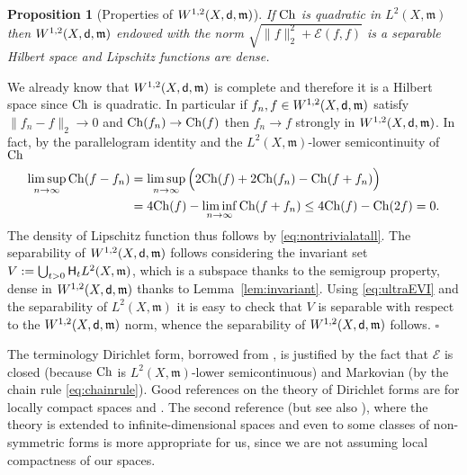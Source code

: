 \documentclass[reqno,11pt]{article}
\numberwithin{equation}{section}
\newcommand{\C}{\mathbb{C}}
\newcommand{\mm}{{\mbox{\boldmath$m$}}}
\newcommand{\sfd}{{\sf d}}
\newenvironment{proof}{\removelastskip\par\medskip   %
\noindent{\em Proof.}
\rm}{\penalty-20\null\hfill$\square$\par\medbreak}
\newtheorem{proposition}[theorem]{Proposition}
\renewcommand{\C}{{\rm Ch}}
\newcommand{\heatl}{{\sf H}}
\renewcommand{\mm}{\mathfrak m}
\begin{document}
\begin{proposition}[Properties of $W^{1,2}(X,\sfd,\mm)$]\label{prop:lipdense}
If $\C$ is quadratic in $L^2(X,\mm)$ then $W^{1,2}(X,\sfd,\mm)$
endowed with the norm $\sqrt{\|f\|_2^2+\mathcal E(f,f)}$ is a
separable Hilbert space and Lipschitz functions are dense.
\end{proposition}
\begin{proof} We already know that $W^{1,2}(X,\sfd,\mm)$ is complete \cite[Remark
4.7]{Ambrosio-Gigli-Savare11} and therefore it is a Hilbert space
since $\C$ is quadratic. In particular if $f_n,f\in
W^{1,2}(X,\sfd,\mm)$ satisfy $\|f_n-f\|_2\to 0$ and
$\C(f_n)\to\C(f)$ then $f_n\to f$ strongly in $W^{1,2}(X,\sfd,\mm)$.
In fact, by the parallelogram identity and the $L^2(X,\mm)$-lower
semicontinuity of $\C$
\begin{align*}
  \limsup_{n\to\infty}\C(f-f_n)&=
  \limsup_{n\to\infty}\Big(2\C(f)+2\C(f_n)-\C(f+f_n)\Big)
  \\&=4\C(f)-\liminf_{n\to\infty} \C(f+f_n)\le 4\C(f)-\C(2f)=0.
\end{align*}
The density of Lipschitz function thus follows by
\eqref{eq:nontrivialatall}. The separability of
$W^{1,2}(X,\sfd,\mm)$ follows considering the invariant set
$V:=\bigcup_{t>0}\heatl_tL^2(X,\mm)$, which is a subspace thanks to
the semigroup property, dense in $W^{1,2}(X,\sfd,\mm)$ thanks to
Lemma~\ref{lem:invariant}. Using \eqref{eq:ultraEVI} and the
separability of $L^2(X,\mm)$ it is easy to check that $V$ is
separable with respect to the $W^{1,2}(X,\sfd,\mm)$ norm, whence the
separability of $W^{1,2}(X,\sfd,\mm)$ follows.
\end{proof}

The terminology Dirichlet form, borrowed from \cite{Fukushima80}, is
justified by the fact that $\mathcal E$ is closed (because $\C$ is
$L^2(X,\mm)$-lower semicontinuous) and Markovian (by the chain rule
\eqref{eq:chainrule}). Good references on the theory of Dirichlet
forms are\cite{Fukushima80,Fukushima-Oshima-Takeda11} for locally
compact spaces and \cite{Rockner92}. The second reference (but see
also \cite[A.4]{Fukushima-Oshima-Takeda11}), where the theory is
extended to infinite-dimensional spaces and even to some classes of
non-symmetric forms is more appropriate for us, since we are not
assuming local compactness of our spaces.
\end{document}
